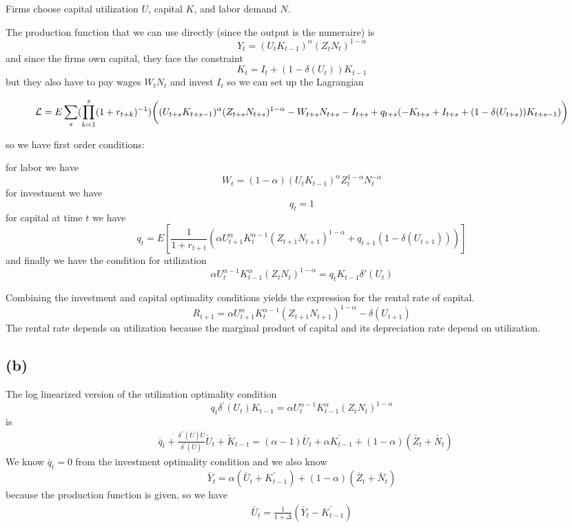 \documentclass[11pt]{amsart}
\begin{document}
Firms choose capital utilization $U$, capital $K$, and labor demand $N$.

The production function that we can use directly (since the output is the numeraire) is
\[
Y_t = (U_t K_{t-1})^{\alpha} (Z_t N_t)^{1-\alpha}
\]
and since the firms own capital, they face the constraint
\[
K_t = I_t + (1 - \delta(U_t)) K_{t-1}
\]
but they also have to pay wages $W_t N_t$ and invest $I_t$
so we can set up the Lagrangian
\begin{tiny}
\[
\mathcal{L} = E \sum_s (\prod_{k=1}^s (1+r_{t+k})^{-1}) \bigg{(} (U_{t+s} K_{t+s-1})^{\alpha} (Z_{t+s} N_{t+s})^{1-\alpha} - W_{t+s} N_{t+s} - I_{t+s} + q_{t+s} (-K_{t+s} +  I_{t+s} + (1 - \delta(U_{t+s})) K_{t+s-1}) \bigg{)}
\]
\end{tiny}
so we have first order conditions:

for labor we have
\[
W_t = (1-\alpha) (U_{t} K_{t-1})^{\alpha} Z_{t}^{1-\alpha} N_t^{-\alpha}
\]
for investment we have
\[
q_t = 1
\]
for capital at time $t$ we have
\[
q_t = E \left[ \frac{1}{1+r_{t+1}} \left( \alpha U_{t+1}^{\alpha} K_t^{\alpha -1} (Z_{t+1} N_{t+1})^{1-\alpha} + q_{t+1} (1 - \delta(U_{t+1}))  \right) \right]
\]
and finally we have the condition for utilization
\[
\alpha U_t^{\alpha - 1} K_{t-1}^{\alpha} (Z_{t} N_{t})^{1-\alpha} = q_t K_{t-1} \delta'(U_t)
\]

Combining the investment and capital optimality conditions yields the expression for the rental rate of capital. 
\[
	R_{t+1} = \alpha U_{t+1}^{\alpha} K_t^{\alpha -1} \left(Z_{t+1} N_{t+1}  \right)^{1-\alpha} - \delta(U_{t+1})
\]
The rental rate depends on utilization because the marginal product of capital and its depreciation rate depend on utilization. 

\subsection*{(b)}
The log linearized version of the utilization optimality condition
	 \[
	 q_t \delta^{'}(U_t) K_{t-1}  = \alpha U_t^{\alpha -1} K_{t-1}^\alpha \left( Z_t N_t \right)^{1-\alpha}
	 \] 
	 is
	\begin{align*}
	&\check{q_t}+ \frac{\delta^{''}(\bar{U}) \bar{U}}{\delta^{'}(\bar{U})} \check{U}_t + \check{K}_{t-1} = (\alpha -1) \check{U_t} + \alpha \check{K_{t-1}}  + (1-\alpha) \left(  \check{Z_t} + \check{N_t}\right) 
	\end{align*}
We know $\check{q_t}=0$ from the investment optimality condition and  we also know 
\[
\check{Y_t} = \alpha \left( \check{U_t} + \check{K_{t-1}} \right) + (1-\alpha) \left(  \check{Z_t} + \check{N_t}\right)
\] 
because the production function is given, so we have
	\begin{align*}
	\check{U_t} = \frac{1}{1 + \Delta} \left( \check{Y_t} - \check{K_{t-1}}\right)
	\end{align*}
\end{document}
